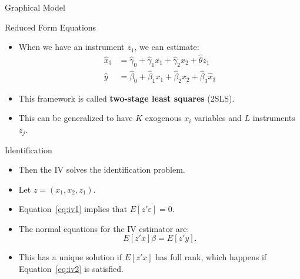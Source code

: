 \documentclass[handout]{beamer} %
\begin{document}
\begin{frame}{Graphical Model}

  \begin{center}
  \end{center}

\end{frame}

\begin{frame}{Reduced Form Equations}

\begin{itemize}
    \item When we have an instrument $z_1$, we can estimate:
      \begin{align*}
        \hat x_3 &= \hat \gamma_0 + \hat \gamma_1 x_1 + \hat \gamma_2 x_2 
          + \hat \theta z_1\\
        \hat y &= \hat \beta_0 + \hat \beta_1 x_1 + \hat \beta_2 x_2 + \hat
        \beta_3 \hat x_3
      \end{align*}
    \item This framework is called \textbf{two-stage least squares} (2SLS).
    \item This can be generalized to have $K$ exogenous $x_i$ variables and $L$
      instruments $z_j$.
\end{itemize}

\end{frame}

\begin{frame}{Identification}

\begin{itemize}
    \item Then the IV solves the identification problem.
    \item Let $z = (x_1, x_2, z_1)$.
    \item Equation~\ref{eq:iv1} implies that $E[z' \varepsilon] = 0$.
    \item The normal equations for the IV estimator are:
      \[E[z'x]\beta = E[z'y].\]
    \item This has a unique solution if $E[z'x]$ has full rank, which happens if
      Equation~\ref{eq:iv2} is satisfied.
\end{itemize}

\end{frame}
\end{document}
